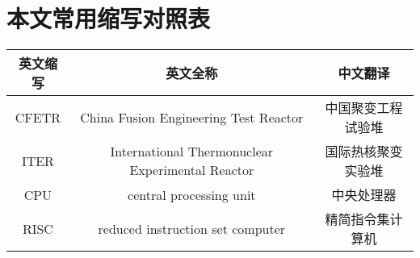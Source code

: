 \chapter{本文常用缩写对照表}

\newcommand{\tabincell}[2]{\begin{tabular}{@{}#1@{}}#2\end{tabular}}
\begin{table}[h]
	\renewcommand\arraystretch{1.5}
	\centering
	\begin{tabular}{*{3}{c}}
		英文缩写 & 英文全称 & 中文翻译 \\
		\midrule
		CFETR & China Fusion Engineering Test Reactor & 中国聚变工程试验堆 \\
		ITER & International Thermonuclear Experimental Reactor & 国际热核聚变实验堆 \\
		CPU & central processing unit & 中央处理器 \\
		RISC & reduced instruction set computer & 精简指令集计算机 \\
	\end{tabular}
\end{table}
